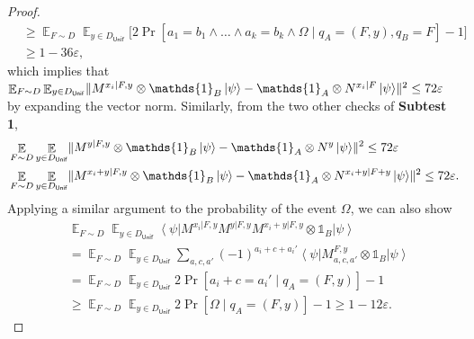 \documentclass[10pt,a4paper]{article}
\theoremstyle{plain}
\theoremstyle{definition}
\DeclarePairedDelimiter{\norm}{\lVert}{\rVert}
\newcommand {\bra} [1] {\ensuremath{ \left\langle #1 \right| }}
\newcommand {\ket} [1] {\ensuremath{ \left| #1 \right\rangle }}
\DeclareMathOperator*{\bigE}{\mathbb{E}}
\newcommand {\id} {\ensuremath{\mathds{1}}}
\newcommand{\ep} {\ensuremath{\varepsilon}}
\newcommand{\x}{\otimes}
\newcommand{\1}{\mathbb{1}} %
\newcommand{\Unif}{\mathsf{Unif}}
\begin{document}
\begin{proof}
\begin{align*}
	& \geq \bigE_{F \sim D} \bigE_{y \in D_{\Unif}} \Big[2 \Pr[a_1 =  b_1 \land \ldots \land a_k = b_k \land \Omega \mid q_A = (F,y), q_B = F] - 1\Big]\\
 &\geq 1 - 36\ep,
\end{align*}
which implies that $\bigE_{F \sim D}  \bigE_{y \in D_{\Unif}} \norm{ M^{x_i| F, y}\x\id_B \ket{\psi} - \id_A \x N^{x_i | F} \ket{\psi}}^2 \leq 72 \ep$ by expanding the vector norm.
Similarly, from the two other checks of \textbf{Subtest 1},
\begin{align*}
	&\bigE_{F \sim D}  \bigE_{y \in D_{\Unif}} \norm{ M^{y | F, y} \x \id_B\ket{\psi} - \id_A \x N^{y } \ket{\psi}}^2 \leq 72 \ep \\
	&\bigE_{F \sim D}  \bigE_{y \in D_{\Unif}} \norm{ M^{x_i+ y | F, y} \x \id_B \ket{\psi} - \id_A \x N^{x_i + y | F + y } \ket{\psi}}^2 \leq 72 \ep.
\end{align*}
Applying a similar argument to the probability of the event $\Omega$, we can also show 
\begin{align*}
	&\bigE_{F \sim D}  \bigE_{y \in D_{\Unif}} \bra{\psi} M^{x_i | F, y} M^{y | F, y} M^{x_i+y| F, y} 
	\x \id_B \ket{\psi} \\
	&= \bigE_{F \sim D}  \bigE_{y \in D_{\Unif}} \sum_{a, c, a'} (-1)^{a_i + c + a_i'} \bra{\psi} M^{F,y}_{a,c,a'} \x \id_B \ket{\psi} \\
	&= \bigE_{F \sim D} \bigE_{y \in D_{\Unif}} 2\Pr[ a_i + c = a_i' \mid q_A = (F,y)] -1 \\
	&\geq \bigE_{F \sim D} \bigE_{y \in D_{\Unif}}  2 \Pr[ \Omega \mid q_A = (F, y)] - 1 \geq 1 - 12\ep.
\end{align*}


\end{proof}
\end{document}
